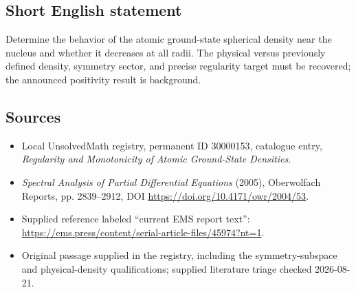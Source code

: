 \documentclass[11pt]{article}
\begin{document}
\subsection{Short English statement}
Determine the behavior of the atomic ground-state spherical density near the nucleus and whether it decreases at all radii. The physical versus previously defined density, symmetry sector, and precise regularity target must be recovered; the announced positivity result is background.
\subsection{Sources}
\begin{itemize}
\item Local UnsolvedMath registry, permanent ID 30000153, catalogue entry, \emph{Regularity and Monotonicity of Atomic Ground-State Densities}.
\item \emph{Spectral Analysis of Partial Differential Equations} (2005), Oberwolfach Reports, pp. 2839--2912, DOI \url{https://doi.org/10.4171/owr/2004/53}.
\item Supplied reference labeled ``current EMS report text'': \url{https://ems.press/content/serial-article-files/45974?nt=1}.
\item Original passage supplied in the registry, including the symmetry-subspace and physical-density qualifications; supplied literature triage checked 2026-08-21.
\end{itemize}
\end{document}

